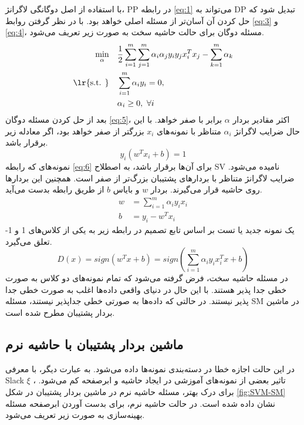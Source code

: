 با استفاده از اصل دوگانگی لاگرانژ، \gls{PP}  در رابطه \ref{eq:1} می‌تواند به \gls{DP}  تبدیل شود که حل کردن آن آسان‌تر از مسئله اصلی خواهد بود. با در نظر گرفتن روابط \ref{eq:3} و \ref{eq:4}، مسئله دوگان برای حالت حاشیه سخت به صورت زیر تعریف می‌شود.
\begin{equation}
\begin{split} 
\min\limits_{\alpha} \quad &\frac{1}{2}\sum\limits_{i=1}^{m}{\sum\limits_{j=1}^{m}{{{\alpha }_{i}}{{\alpha }_{j}}{{y}_{i}}{{y}_{j}}x_{i}^{T}{{x}_{j}}-\sum\limits_{k=1}^{m}{{{\alpha }_{k}}}}} \\
\textrm{\lr{s.t. }} \quad &\sum\limits_{i=1}^{m}{\alpha_{i}y_{i}}=0, \\
&\alpha_{i}\ge 0,\text{ }\forall i
\end{split}
\label{eq:5}
\end{equation}
بعد از حل کردن مسئله دوگان \ref{eq:5}، اکثر مقادیر بردار $\alpha$ برابر با صفر خواهد. با این حال ضرایب لاگرانژ  $\alpha_i$ متناظر با نمونه‌های $x_i$ بزرگتر از صفر خواهد بود، اگر معادله زیر برقرار باشد.
\begin{equation}
{{y}_{i}}({{w}^{T}}{{x}_{i}}+b)=1
\label{eq:6}
\end{equation}
\indent نمونه‌های  که رابطه \ref{eq:6} برای آن‌ها برقرار باشد، به اصطلاح \gls{SV}  نامیده می‌شود. ضرایب لاگرانژ متناظر با بردار‌های پشتیبان بزرگ‌تر از صفر است. همچنین این بردارها روی حاشیه قرار می‌گیرند. بردار $w$  و بایاس  $b$ از طریق رابطه  بدست می‌آید.
\begin{equation}
\begin{split}
w &= \sum\limits_{i=1}^{m}{\alpha_{i}y_{i}x_{i}} \\
b &= y_{i}-{w}^{T}{x}_{i}
\end{split}
\label{eq:7}
\end{equation}
یک نمونه جدید یا تست بر اساس تابع تصمیم در رابطه زیر به یکی از کلاس‌های 1 و 1- تعلق می‌گیرد.
\begin{equation}
D(x)=sign({{w}^{T}}x+b) = sign(\sum\limits_{i=1}^{m}{\alpha_{i}y_{i}x_{i}^{T}} x + b)
\label{eq:8}
\end{equation}
\indent در مسئله حاشیه سخت، فرض گرفته می‌شود که تمام نمونه‌های دو کلاس به صورت خطی جدا پذیر هستند. با این حال در دنیای واقعی داده‌ها اغلب به صورت خطی جدا پذیر نیستند. در حالتی که داده‌ها به صورتی خطی جداپذیر نیستند، مسئله \gls{SM}  در ماشین بردار پشتیبان مطرح شده است.

\subsection{ماشین بردار پشتیبان با حاشیه نرم} \label{sec:2:1:2}
در این حالت اجازه خطا در دسته‌بندی نمونه‌ها داده می‌شود. به عبارت دیگر، با معرفی \gls{Slack} $\xi$ ، تاثیر بعضی از نمونه‌های آموزشی در ایجاد حاشیه و ابرصفحه کم می‌شود. برای درک بهتر، مسئله حاشیه نرم در ماشین بردار پشتیبان در شکل \ref{fig:SVM-SM}‏ نشان داده شده است. در حالت حاشیه نرم، برای بدست آوردن ابرصفحه مسئله بهینه‌سازی به صورت زیر تعریف می‌شود.


